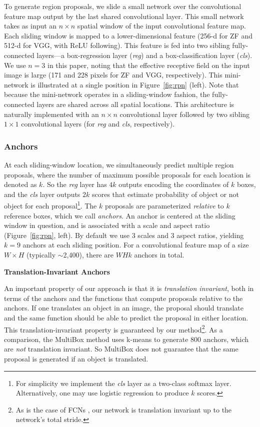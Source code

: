 \documentclass[10pt,journal,cspaper,compsoc]{IEEEtran}
\begin{document}
To generate region proposals, we slide a small network over the convolutional feature map output by the last shared convolutional layer.
This small network takes as input an $n \times n$ spatial window of the input convolutional feature map.
Each sliding window is mapped to a lower-dimensional feature (256-d for ZF and 512-d for VGG, with ReLU \cite{Nair2010} following).
This feature is fed into two sibling fully-connected layers---a box-regression layer (\emph{reg}) and a box-classification layer (\emph{cls}).
We use $n=3$ in this paper, noting that the effective receptive field on the input image is large (171 and 228 pixels for ZF and VGG, respectively).
This mini-network is illustrated at a single position in Figure~\ref{fig:rpn} (left).
Note that because the mini-network operates in a sliding-window fashion, the fully-connected layers are shared across all spatial locations.
This architecture is naturally implemented with an $n \times n$ convolutional layer followed by two sibling $1 \times 1$ convolutional layers (for \emph{reg} and \emph{cls}, respectively). %


\subsubsection{Anchors}

At each sliding-window location, we simultaneously predict multiple region proposals, where the number of maximum possible proposals for each location is denoted as $k$.
So the \emph{reg} layer has $4k$ outputs encoding the coordinates of $k$ boxes, and the \emph{cls} layer outputs $2k$ scores that estimate probability of object or not object for each proposal\footnote{For simplicity we implement the \emph{cls} layer as a two-class softmax layer. Alternatively, one may use logistic regression to produce $k$ scores.}. The $k$ proposals are parameterized \emph{relative} to $k$ reference boxes, which we call \emph{anchors}. An anchor is centered at the sliding window in question, and is associated with a scale and aspect ratio (Figure~\ref{fig:rpn}, left). By default we use 3 scales and 3 aspect ratios, yielding $k=9$ anchors at each sliding position. For a convolutional feature map of a size $W \times H$ (typically $\sim$2,400), there are $WHk$ anchors in total.

\vspace{.5em}
\noindent\textbf{Translation-Invariant Anchors}

An important property of our approach is that it is \emph{translation invariant}, both in terms of the anchors and the functions that compute proposals relative to the anchors.
If one translates an object in an image, the proposal should translate and the same function should be able to predict the proposal in either location. This translation-invariant property is guaranteed by our method\footnote{As is the case of FCNs \cite{Long2015}, our network is translation invariant up to the network's total stride.}.
As a comparison, the MultiBox method \cite{Szegedy2014a} uses k-means to generate 800 anchors, which are \emph{not} translation invariant. So MultiBox does not guarantee that the same proposal is generated if an object is translated.
\end{document}
